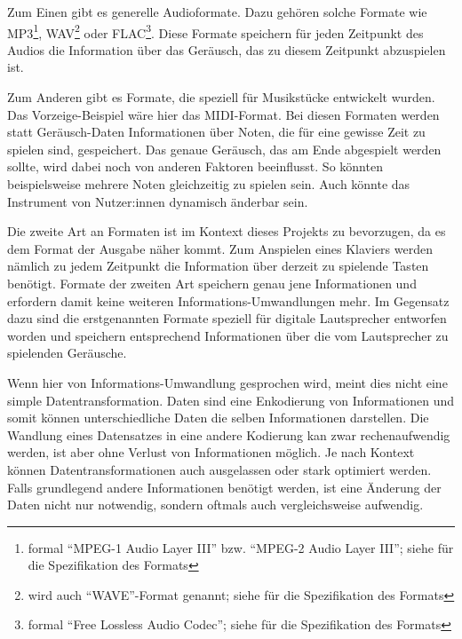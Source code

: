 Zum Einen gibt es generelle Audioformate. Dazu gehören solche Formate wie MP3\footnote{formal \enquote{MPEG-1 Audio Layer III} bzw. \enquote{MPEG-2 Audio Layer III}; siehe \cite{iso.MP3} für die Spezifikation des Formats}, WAV\footnote{wird auch \enquote{WAVE}-Format genannt; siehe \cite{kab.WaveFileSpecifications.22} für die Spezifikation des Formats} oder FLAC\footnote{formal \enquote{Free Lossless Audio Codec}; siehe \cite{bw.FLAC.24} für die Spezifikation des Formats}.
Diese Formate speichern für jeden Zeitpunkt des Audios die Information über das Geräusch, das zu diesem Zeitpunkt abzuspielen ist.

Zum Anderen gibt es Formate, die speziell für Musikstücke entwickelt wurden.
Das Vorzeige-Beispiel wäre hier das \ac{MIDI}-Format.
Bei diesen Formaten werden statt Geräusch-Daten Informationen über Noten, die für eine gewisse Zeit zu spielen sind, gespeichert.
Das genaue Geräusch, das am Ende abgespielt werden sollte, wird dabei noch von anderen Faktoren beeinflusst.
So könnten beispielsweise mehrere Noten gleichzeitig zu spielen sein.
Auch könnte das Instrument von Nutzer:innen dynamisch änderbar sein.

Die zweite Art an Formaten ist im Kontext dieses Projekts zu bevorzugen, da es dem Format der Ausgabe näher kommt.
Zum Anspielen eines Klaviers werden nämlich zu jedem Zeitpunkt die Information über derzeit zu spielende Tasten benötigt.
Formate der zweiten Art speichern genau jene Informationen und erfordern damit keine weiteren Informations-Umwandlungen mehr. \newline
Im Gegensatz dazu sind die erstgenannten Formate speziell für digitale Lautsprecher entworfen worden und speichern entsprechend Informationen über die vom Lautsprecher zu spielenden Geräusche.

Wenn hier von Informations-Umwandlung gesprochen wird, meint dies nicht eine simple Datentransformation.
Daten sind eine Enkodierung von Informationen und somit können unterschiedliche Daten die selben Informationen darstellen.
Die Wandlung eines Datensatzes in eine andere Kodierung kan zwar rechenaufwendig werden, ist aber ohne Verlust von Informationen möglich.
Je nach Kontext können Datentransformationen auch ausgelassen oder stark optimiert werden.
Falls grundlegend andere Informationen benötigt werden, ist eine Änderung der Daten nicht nur notwendig, sondern oftmals auch vergleichsweise aufwendig.

